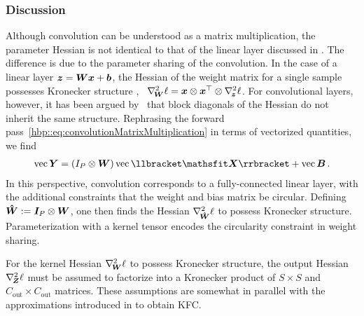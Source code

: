 \subsubsection{Discussion}
Although convolution can be understood as a matrix multiplication, the parameter
Hessian is not identical to that of the linear layer discussed in
. The difference is due to the
parameter sharing of the convolution. In the case of a linear layer ${\bm{z}} = {\bm{W}}
{\bm{x}} + {\bm{b}}$, the Hessian of the weight matrix for a single sample possesses
Kronecker structure
\citep{botev2017practical,wei2018bdapch,bakker2018OuterProductStructure},
\ie~$\nabla_{\!{{\bm{W}}}}^{2}\ell = {\bm{x}} \otimes {\bm{x}}^\top \otimes
\nabla_{\!{{\bm{z}}}}^{2}\ell$. For convolutional layers, however, it has been argued
by~\cite{bakker2018OuterProductStructure} that block diagonals of the Hessian do
not inherit the same structure. Rephrasing the forward
pass~\eqref{hbp::eq:convolutionMatrixMultiplication} in terms of vectorized
quantities, we find
\begin{align*}
  \label{hbp::eq:convolutionMatrixMultiplicationCircular}
  \vec \mY
  =
  \left( I_P \otimes \mW \right)
  \vec \llbracket \tX \rrbracket
  +
  \vec \mB\,.
\end{align*}
In this perspective, convolution corresponds to a fully-connected linear layer,
with the additional constraints that the weight and bias matrix be circular.
Defining ${\bm{\hat{W}}} := {\bm{I}}_P \otimes {\bm{W}}$, one then finds the Hessian
$\nabla_{\!{{\bm{\hat{W}}}}}^{2}\ell$ to possess Kronecker structure. Parameterization with
a kernel tensor encodes the circularity constraint in weight sharing.

For the kernel Hessian $\nabla_{\!{{\bm{W}}}}^{2}\ell$ to possess Kronecker structure,
the output Hessian $\nabla_{\!{{\bm{Z}}}}^{2}\ell$ must be assumed to factorize into a
Kronecker product of $S\times S$ and $C_\text{out} \times C_\text{out}$
matrices. These assumptions are somewhat in parallel with the approximations
introduced in \cite{grosse2016kronecker} to obtain KFC.

